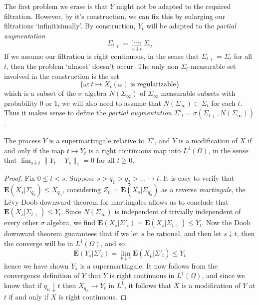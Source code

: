 The first problem we erase is that $Y$ might not be adapted to the required filtration. However, by it's construction, we can fix this by enlarging our filtrations `infinitisimally'. By construction, $Y_t$ will be adapted to the {\it partial augmentation}
%
\[ \Sigma_{t+} = \lim_{u \downarrow t} \Sigma_u \]
%
If we assume our filtration is right continuous, in the sense that $\Sigma_{t+} = \Sigma_t$ for all $t$, then the problem `almost' doesn't occur. The only non $\Sigma_t$-measurable set involved in the construction is the set
%
\[ \{ \omega: t \mapsto X_t(\omega)\ \text{is regularizable} \} \]
%
which is a subset of the $\sigma$ algebra $N(\Sigma_\infty)$ of $\Sigma_\infty$ measurable subsets with probability $0$ or $1$, we will also need to assume that $N(\Sigma_\infty) \subset \Sigma_t$ for each $t$. Thus it makes sense to define the {\it partial augmentation} $\Sigma'_t = \sigma(\Sigma_{t+},N(\Sigma_\infty))$.

\begin{theorem}
    The process $Y$ is a supermartingale relative to $\Sigma'$, and $Y$ is a modification of $X$ if and only if the map $t \mapsto Y_t$ is a right continuous map into $L^1(\Omega)$, in the sense that $\lim_{s \downarrow t} \| Y_t - Y_s \|_1 = 0$ for all $t \geq 0$.
\end{theorem}
\begin{proof}
    Fix $0 \leq t < s$. Suppose $s > q_1 > q_2 > \dots \to t$. It is easy to verify that $\mathbf{E}(X_s|\Sigma_{q_n}) \leq X_{q_n}$, considering $Z_n = \mathbf{E}(X_s|\Sigma_{q_n})$ as a reverse {\it martingale}, the L\'{e}vy-Doob downward theorem for martingales allows us to conclude that $\mathbf{E}(X_s|\Sigma_{t+}) \leq Y_t$. Since $N(\Sigma_\infty)$ is independent of trivially independent of every other $\sigma$ algebra, we find $\mathbf{E}(X_s|\Sigma'_t) = \mathbf{E}(X_s|\Sigma_{t+}) \leq Y_t$. Now the Doob downward theorem guarantees that if we let $s$ be rational, and then let $s \downarrow t$, then the converge will be in $L^1(\Omega)$, and so
    \[ \mathbf{E}(Y_s|\Sigma'_t) = \lim_{p \downarrow s} \mathbf{E}(X_p|\Sigma'_t) \leq Y_t \]
    hence we have shown $Y_s$ is a supermartingale. It now follows from the convergence definition of $Y$ that $Y$ is right continuous in $L^1(\Omega)$, and since we know that if $q_n \downarrow t$ then $X_{q_n} \to Y_t$ in $L^1$, it follows that $X$ is a modification of $Y$ at $t$ if and only if $X$ is right continuous.
\end{proof}

